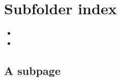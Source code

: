 \section{Subfolder index}
\label{\detokenize{subfolder/index:subfolder-index}}\label{\detokenize{subfolder/index::doc}}
\sphinxAtStartPar
{}
\begin{itemize}
\item{} 

\item{} 
\sphinxAtStartPar
{}

\end{itemize}


\subsection{A subpage}
\label{\detokenize{subfolder/asubpage:a-subpage}}\label{\detokenize{subfolder/asubpage::doc}}






\renewcommand{\indexname}{Index}
\printindex

